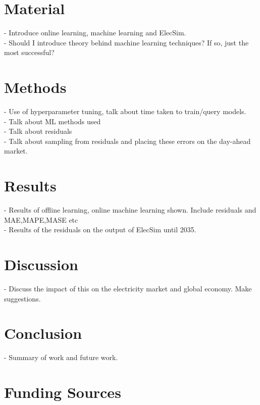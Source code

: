 \documentclass[final,3p,times,twocolumn,numbers]{elsarticle}
\begin{document}
\section{Material}
\label{sec:material}

- Introduce online learning, machine learning and ElecSim.\\
- Should I introduce theory behind machine learning techniques? If so, just the most successful?
 
\section{Methods}
\label{sec:methods}

- Use of hyperparameter tuning, talk about time taken to train/query models.\\
- Talk about ML methods used\\
- Talk about residuals\\
- Talk about sampling from residuals and placing these errors on the day-ahead market.\\


\section{Results}
\label{sec:results}

- Results of offline learning, online machine learning shown. Include residuals and MAE,MAPE,MASE etc\\

- Results of the residuals on the output of ElecSim until 2035.\\

\section{Discussion}
\label{sec:discussion}

- Discuss the impact of this on the electricity market and global economy. Make suggestions.

\section{Conclusion}
\label{sec:conclusion}

- Summary of work and future work.

\section{Funding Sources}
\end{document}
